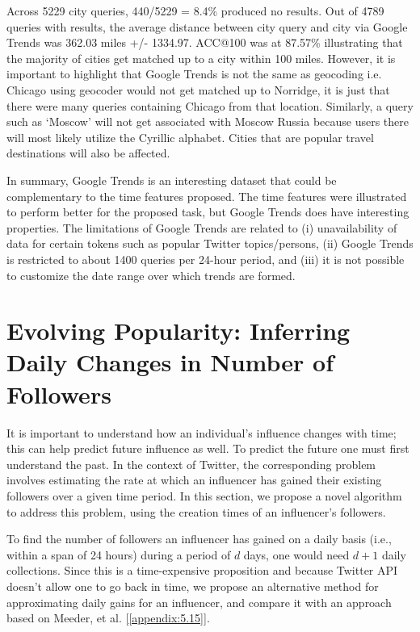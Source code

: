 Across 5229 city queries, 440/5229 = 8.4\%  produced no results. Out of 4789 queries with results, the average distance between city query and city via Google Trends was 362.03 miles +/- 1334.97. ACC@100 was at 87.57\% illustrating that the majority of cities get matched up to a city within 100 miles. However, it is important to highlight that Google Trends is not the same as geocoding i.e. Chicago using geocoder would not get matched up to Norridge, it is just that there were many queries containing Chicago from that location. Similarly, a query such as `Moscow' will not get associated with Moscow Russia because users there will most likely utilize the Cyrillic alphabet. Cities that are popular travel destinations will also be affected.

In summary, Google Trends is an interesting dataset that could be complementary to the time features proposed. The time features were illustrated to perform better for the proposed task, but Google Trends does have interesting properties. The limitations of Google Trends are related to (i) unavailability of data for certain tokens such as popular Twitter topics/persons, (ii) Google Trends is restricted to about 1400 queries per 24-hour period, and (iii) it is not possible to customize the date range over which trends are formed.

\section{Evolving Popularity: Inferring Daily Changes in Number of Followers} \label{sec5}

It is important to understand how an individual's influence changes with time; this can help predict future influence as well. To predict the future one must first understand the past. In the context of Twitter, the corresponding problem involves estimating the rate at which an influencer has gained their existing followers over a given time period. In this section, we propose a novel algorithm to address this problem, using the creation times of an influencer's followers.

To find the number of followers an influencer has gained on a daily basis (i.e., within a span of 24 hours) during a period of $d$ days, one would need $d+1$ daily collections.
Since this is a time-expensive proposition and because Twitter API doesn't allow one to go back in time,   we propose an alternative method for approximating daily gains for  an influencer, and compare it with an approach based on Meeder, et al. [\ref{appendix:5.15}].

